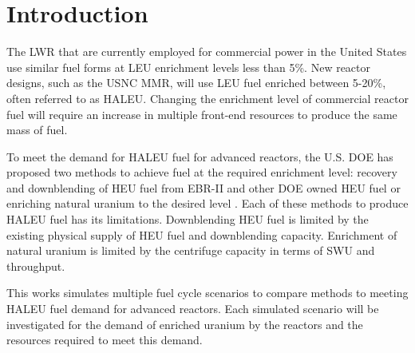 \section{Introduction}
The \gls{LWR} that are currently employed for commercial power in the 
United States use similar fuel forms at \gls{LEU} enrichment levels 
less than 5\%. New reactor designs, such as the \gls{USNC} \gls{MMR}, will 
use \gls{LEU} fuel enriched between 5-20\%, often referred to as \gls{HALEU}.
Changing the enrichment level of commercial reactor fuel will require 
an increase in multiple front-end resources to produce the same mass of fuel. 

To meet the demand for \gls{HALEU} fuel for advanced reactors, the U.S. 
\gls{DOE} has proposed two methods to achieve fuel at the 
required enrichment level: recovery and downblending of \gls{HEU} fuel 
from EBR-II and other \gls{DOE} owned \gls{HEU} fuel or enriching natural 
uranium to the desired level \cite{griffith_overview_2020}. Each of these 
methods to produce \gls{HALEU} fuel has its limitations. Downblending
\gls{HEU} fuel is limited by the existing physical supply of \gls{HEU}
fuel and downblending capacity. Enrichment of natural uranium is limited by
the centrifuge capacity in terms of \gls{SWU} and throughput.

This works simulates multiple fuel cycle scenarios to compare methods 
to meeting \gls{HALEU} fuel demand for advanced reactors. Each simulated 
scenario will be investigated for the demand of enriched uranium by the 
reactors and the resources required to meet this demand. 